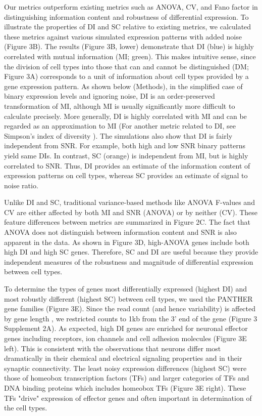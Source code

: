 Our metrics outperform existing metrics such as ANOVA, CV, and Fano factor in distinguishing information content and robustness of differential expression. To illustrate the properties of DI and SC relative to existing metrics, we calculated these metrics against various simulated expression patterns with added noise (Figure 3B). The results (Figure 3B, lower) demonstrate that DI (blue) is highly correlated with mutual information (MI; green). This makes intuitive sense, since the division of cell types into those that can and cannot be distinguished (DM; Figure 3A) corresponds to a unit of information about cell types provided by a gene expression pattern. As shown below (Methods), in the simplified case of binary expression levels and ignoring noise, DI is an order-preserved transformation of MI, although MI is usually significantly more difficult to calculate precisely. More generally, DI is highly correlated with MI and can be regarded as an approximation to MI (For another metric related to DI, see Simpson's index of diversity \cite{SIMPSON_1949}). The simulations also show that DI is fairly independent from SNR. For example, both high and low SNR binary patterns yield same DIs. In contrast, SC (orange) is independent from MI, but is highly correlated to SNR. Thus, DI provides an estimate of the information content of expression patterns on cell types, whereas SC provides an estimate of signal to noise ratio.

Unlike DI and SC, traditional variance-based methods like ANOVA F-values and CV are either affected by both MI and SNR (ANOVA) or by neither (CV). These feature differences between metrics are summarized in Figure 2C. The fact that ANOVA does not distinguish between information content and SNR is also apparent in the data. As shown in Figure 3D, high-ANOVA genes include both high DI and high SC genes. Therefore, SC and DI are useful because they provide independent measures of the robustness and magnitude of differential expression between cell types.

To determine the types of genes most differentially expressed (highest DI) and most robustly different (highest SC) between cell types, we used the PANTHER gene families (Figure 3E). Since the read count (and hence variability) is affected by gene length \cite{Oshlack_2009}, we restricted counts to 1kb from the 3' end of the gene (Figure 3 Supplement 2A). As expected, high DI genes are enriched for neuronal effector genes including receptors, ion channels and cell adhesion molecules (Figure 3E left). This is consistent with the observations that neurons differ most dramatically in their chemical and electrical signaling properties and in their synaptic connectivity. The least noisy expression differences (highest SC) were those of homeobox transcription factors (TFs) and larger categories of TFs and DNA binding proteins which includes homeobox TFs (Figure 3E right). These TFs "drive" expression of effector genes and often important in determination of the cell types. 

